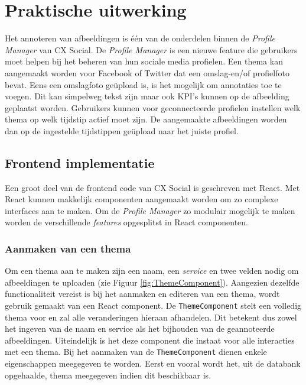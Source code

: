 
\chapter{Praktische uitwerking}
\vspace{-3cm}
Het annoteren van afbeeldingen is \'{e}\'{e}n van de onderdelen binnen de \textit{Profile Manager} van CX Social. De \textit{Profile Manager} is een nieuwe feature die gebruikers moet helpen bij het beheren van hun sociale media profielen. Een thema kan aangemaakt worden voor Facebook of Twitter dat een omslag-en/of profielfoto bevat. Eens een omslagfoto ge\"{u}pload is, is het mogelijk om annotaties toe te voegen. Dit kan simpelweg tekst zijn maar ook KPI's kunnen op de afbeelding geplaatst worden. Gebruikers kunnen voor geconnecteerde profielen instellen welk thema op welk tijdstip actief moet zijn. De aangemaakte afbeeldingen worden dan op de ingestelde tijdstippen ge\"{u}pload naar het juiste profiel. 


\section{\textbf{Frontend implementatie}}
Een groot deel van de frontend code van CX Social is geschreven met React. Met React kunnen makkelijk componenten aangemaakt worden om zo complexe interfaces aan te maken. Om de \textit{Profile Manager} zo modulair mogelijk te maken worden de verschillende \textit{features} opgesplitst in React componenten. 

\subsection{Aanmaken van een thema} \label{AanmakenVanEenThema}

Om een thema aan te maken zijn een naam, een \textit{service} %
en twee velden nodig om afbeeldingen te uploaden (zie Figuur \ref{fig:ThemeComponent}). Aangezien dezelfde functionaliteit vereist is bij het aanmaken en editeren van een thema, wordt gebruik gemaakt van een React component. De \texttt{ThemeComponent} stelt een volledig thema voor en zal alle veranderingen hieraan afhandelen. Dit betekent dus zowel het ingeven van de naam en service als het bijhouden van de geannoteerde afbeeldingen. Uiteindelijk is het deze component die instaat voor alle interacties met een thema. 
Bij het aanmaken van de \texttt{ThemeComponent} dienen enkele eigenschappen meegegeven te worden. Eerst en vooral wordt het, uit de databank opgehaalde, thema meegegeven indien dit beschikbaar is. %

